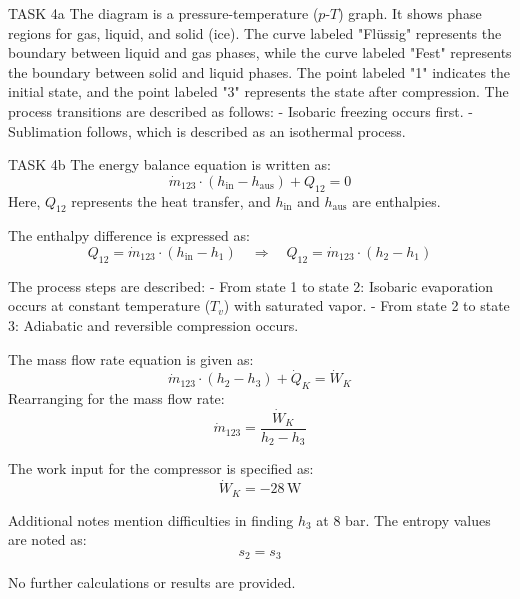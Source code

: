 TASK 4a  
The diagram is a pressure-temperature (\( p \)-\( T \)) graph. It shows phase regions for gas, liquid, and solid (ice). The curve labeled "Flüssig" represents the boundary between liquid and gas phases, while the curve labeled "Fest" represents the boundary between solid and liquid phases. The point labeled "1" indicates the initial state, and the point labeled "3" represents the state after compression. The process transitions are described as follows:  
- Isobaric freezing occurs first.  
- Sublimation follows, which is described as an isothermal process.  

TASK 4b  
The energy balance equation is written as:  
\[
\dot{m}_{123} \cdot (h_{\text{in}} - h_{\text{aus}}) + Q_{12} = 0
\]  
Here, \( Q_{12} \) represents the heat transfer, and \( h_{\text{in}} \) and \( h_{\text{aus}} \) are enthalpies.  

The enthalpy difference is expressed as:  
\[
Q_{12} = \dot{m}_{123} \cdot (h_{\text{in}} - h_1) \quad \Rightarrow \quad Q_{12} = \dot{m}_{123} \cdot (h_2 - h_1)
\]  

The process steps are described:  
- From state 1 to state 2: Isobaric evaporation occurs at constant temperature (\( T_v \)) with saturated vapor.  
- From state 2 to state 3: Adiabatic and reversible compression occurs.  

The mass flow rate equation is given as:  
\[
\dot{m}_{123} \cdot (h_2 - h_3) + \dot{Q}_K = \dot{W}_K
\]  
Rearranging for the mass flow rate:  
\[
\dot{m}_{123} = \frac{\dot{W}_K}{h_2 - h_3}
\]  

The work input for the compressor is specified as:  
\[
\dot{W}_K = -28 \, \text{W}
\]  

Additional notes mention difficulties in finding \( h_3 \) at 8 bar. The entropy values are noted as:  
\[
s_2 = s_3
\]  

No further calculations or results are provided.